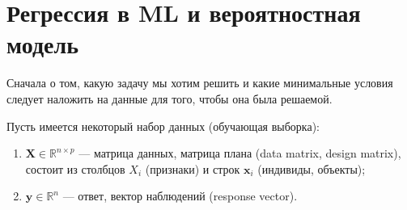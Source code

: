 \documentclass[12pt,a4paper,final]{article}
\newcommand{\X}{\bm{X}}
\newcommand{\y}{\bm{y}}
\newcommand{\1}{\mathds{1}}
\begin{document}
%
%

\section{Регрессия в ML и вероятностная модель}

Сначала о том, какую задачу мы хотим решить и какие минимальные условия следует наложить на данные для того, чтобы она была решаемой.

Пусть имеется некоторый набор данных (обучающая выборка):
\begin{enumerate}
  \item $\X \in \mathbb R^{n \times p}$ --- матрица данных, матрица плана (data matrix, design matrix), состоит из столбцов $X_i$ (признаки) и строк $\mathbf x_i$ (индивиды, объекты); 
  \item $\y \in \mathbb R^n$ --- ответ, вектор наблюдений (response vector). 
\end{enumerate}
\textbf{\color{blue}{Задача регрессии:}}
\end{document}
